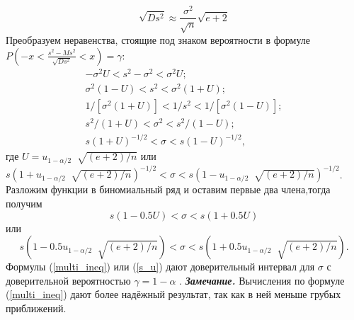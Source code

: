 \documentclass[../body.tex]{subfiles}
\begin{document}
	\begin{equation}
		\sqrt{Ds^{2}} \approx \frac{\sigma^{2}}{\sqrt{n}}\sqrt{e + 2}
		\label{sqrt_Ds}
	\end{equation}
	Преобразуем неравенства, стоящие под знаком вероятности в формуле
	\newline
	$P\left(-x < \frac{s^{2}-Ms^{2}}{\sqrt{Ds^{2}}} < x\right) = \gamma$:
	\begin{equation}
		\begin{split}
			-\sigma^{2}U < s^{2} -\sigma^{2} < \sigma^{2}U; \\
			\sigma^{2}(1-U) < s^{2} < \sigma^{2}(1 + U); \\
			1/[\sigma^{2}(1 + U)] < 1/s^{2} < 1/[\sigma^{2}(1-U)];\\
			s^{2}/(1 + U) < \sigma^{2} < s^{2}/(1-U);\\
			s(1 + U)^{-1/2} < \sigma < s(1-U)^{-1/2},
			\label{multi_ineq}
		\end{split}
	\end{equation}
	где $U = u_{1-\alpha/2}︀\sqrt{(e + 2)/n}$ или
	\newline
	$s(1 +  u_{1-\alpha/2}︀\sqrt{(e + 2)/n})^{-1/2} <\sigma < s(1-u_{1-\alpha/2}︀\sqrt{(e + 2)/n})^{-1/2}$.
	\newline
	Разложим функции в биномиальный ряд и оставим первые два члена,тогда получим
	\begin{equation}
		s(1-0.5U) < \sigma < s(1 + 0.5U)
		\label{s_U}
	\end{equation}
	или
	\begin{equation}
		s(1-0.5u_{1-\alpha/2}︀\sqrt{(e + 2)/n}) < \sigma < s(1 + 0.5 u_{1-\alpha/2}︀\sqrt{(e + 2)/n}).
		\label{s_u}
	\end{equation}
	Формулы (\ref{multi_ineq}) или (\ref{s_u}) дают доверительный интервал для $\sigma$ с доверительной вероятностью $\gamma = 1-\alpha$ \cite[c.~461-462]{max}. 
	\newline
	\textbf{\textit{Замечание.}} Вычисления по формуле (\ref{multi_ineq}) дают более надёжный результат, так как в ней меньше грубых приближений.
\end{document}
